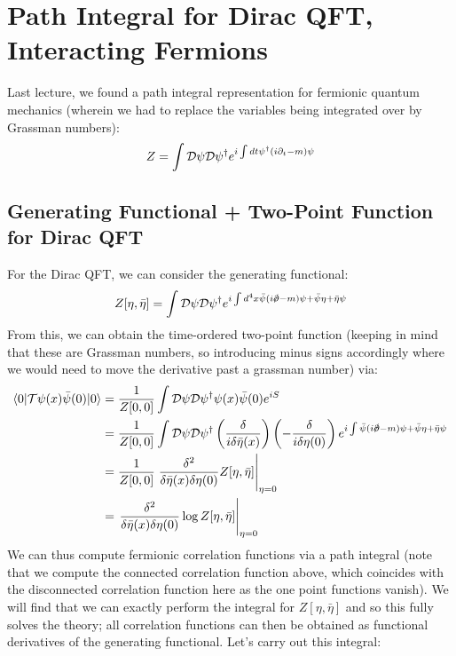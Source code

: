 \section{Path Integral for Dirac QFT, Interacting Fermions}
Last lecture, we found a path integral representation for fermionic quantum mechanics (wherein we had to replace the variables being integrated over by Grassman numbers):
\begin{equation}
    Z = \int \mathcal{D}\psi \mathcal{D}\psi^\dagger e^{i\int dt \psi^\dagger (i\partial_t - m)\psi}
\end{equation}

\subsection{Generating Functional + Two-Point Function for Dirac QFT}
For the Dirac QFT, we can consider the generating functional:
\begin{equation}
    Z[\eta, \bar{\eta}] = \int \mathcal{D}\psi \mathcal{D}\psi^\dag e^{i\int d^4x \bar{\psi}(i\slashed{\p} - m)\psi + \bar{\psi}\eta + \bar{\eta}\psi}
\end{equation}
From this, we can obtain the time-ordered two-point function (keeping in mind that these are Grassman numbers, so introducing minus signs accordingly where we would need to move the derivative past a grassman number) via:
\begin{equation}
    \begin{split}
        \bra{0}\mathcal{T}\psi(x)\bar{\psi}(0)\ket{0} &= \frac{1}{Z[0, 0]}\int \mathcal{D}\psi\mathcal{D}\psi^\dag \psi(x)\bar{\psi}(0)e^{iS} 
        \\ &= \frac{1}{Z[0, 0]}\int \mathcal{D}\psi\mathcal{D}\psi^\dag\left(\frac{\delta}{i\delta \bar{\eta}(x)}\right) \left(-\frac{\delta}{i\delta \eta(0)}\right) e^{i\int \bar{\psi}(i\slashed{\p} - m)\psi + \bar{\psi}\eta + \bar{\eta}\psi}
        \\ &= \frac{1}{Z[0, 0]}\left.\frac{\delta^2}{\delta \bar{\eta}(x)\delta \eta(0)}Z[\eta, \bar{\eta}]\right|_{\eta=0}
        \\ &= \left.\frac{\delta^2}{\delta \bar{\eta}(x)\delta \eta(0)}\log Z[\eta, \bar{\eta}]\right|_{\eta=0}
    \end{split}
\end{equation}
We can thus compute fermionic correlation functions via a path integral (note that we compute the connected correlation function above, which coincides with the disconnected correlation function here as the one point functions vanish). We will find that we can exactly perform the integral for $Z[\eta, \bar{\eta}]$ and so this fully solves the theory; all correlation functions can then be obtained as functional derivatives of the generating functional. Let's carry out this integral:
